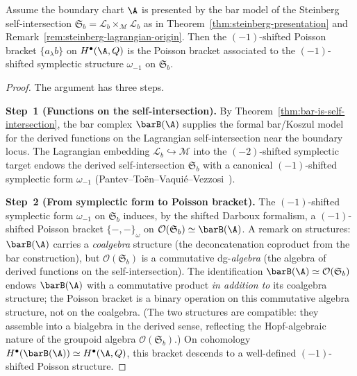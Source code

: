 \providecommand{\Steinb}{\mathfrak{S}}

\begin{proposition}
\label{prop:PVA-from-symplectic}
Assume the boundary chart $\A$ is presented by the bar model of the
Steinberg self-intersection
$\Steinb_b = \mathscr{L}_b \times_{\mathscr{M}} \mathscr{L}_b$
as in Theorem~\textup{\ref{thm:steinberg-presentation}} and
Remark~\textup{\ref{rem:steinberg-lagrangian-origin}}. Then the
$(-1)$-shifted Poisson bracket $\{a_\lambda b\}$ on $H^\bullet(\A,Q)$ is
the Poisson bracket associated to the $(-1)$-shifted symplectic structure
$\omega_{-1}$ on $\Steinb_b$.
\end{proposition}

\begin{proof}
The argument has three steps.

\smallskip
\noindent\textbf{Step~1 (Functions on the self-intersection).}
By Theorem~\ref{thm:bar-is-self-intersection}, the bar complex
$\barB(\A)$ supplies the formal bar/Koszul model for the derived
functions on the Lagrangian self-intersection near the boundary
locus.
The Lagrangian embedding
$\mathscr{L}_b \hookrightarrow \mathscr{M}$ into the $(-2)$-shifted
symplectic target endows the derived self-intersection $\Steinb_b$ with a
canonical $(-1)$-shifted symplectic form $\omega_{-1}$
(Pantev--To\"en--Vaqui\'e--Vezzosi~\cite{PTVV13}).

\smallskip
\noindent\textbf{Step~2 (From symplectic form to Poisson bracket).}
The $(-1)$-shifted symplectic form $\omega_{-1}$ on $\Steinb_b$ induces,
by the shifted Darboux formalism, a $(-1)$-shifted Poisson bracket
$\{-,-\}_{\omega}$ on $\mathcal{O}(\Steinb_b) \simeq \barB(\A)$.
A remark on structures: $\barB(\A)$ carries a
\emph{coalgebra} structure (the deconcatenation coproduct from the
bar construction), but $\mathcal{O}(\Steinb_b)$ is a commutative
dg-\emph{algebra} (the algebra of derived functions on the
self-intersection). The identification
$\barB(\A) \simeq \mathcal{O}(\Steinb_b)$ endows $\barB(\A)$ with
a commutative product \emph{in addition to} its coalgebra structure;
the Poisson bracket is a binary operation on this commutative
algebra structure, not on the coalgebra. (The two structures are
compatible: they assemble into a bialgebra in the derived sense,
reflecting the Hopf-algebraic nature of the groupoid algebra
$\mathcal{O}(\Steinb_b)$.)
On cohomology $H^\bullet(\barB(\A)) \simeq H^\bullet(\A,Q)$, this
bracket descends to a well-defined $(-1)$-shifted Poisson structure.


\end{proof}
